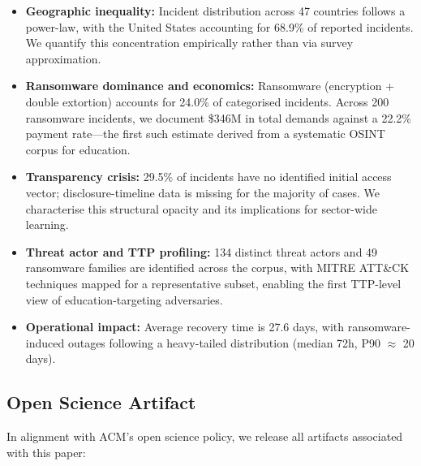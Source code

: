 \documentclass[sigconf,anonymous]{acmart}
\newcommand{\numcountries}{47\xspace}
\newcommand{\numransomware}{200\xspace}
\newcommand{\numactors}{134\xspace}
\newcommand{\numfamilies}{49\xspace}
\newcommand{\avgrecovery}{27.6\xspace}
\newcommand{\totaldemanded}{\$346M\xspace}
\newcommand{\paymentrate}{22.2\%\xspace}
\begin{document}
\begin{itemize}[leftmargin=*,nosep]
  \item \textbf{Geographic inequality:} Incident distribution across \numcountries countries follows a power-law, with the United States accounting for 68.9\% of reported incidents. We quantify this concentration empirically rather than via survey approximation.

  \item \textbf{Ransomware dominance and economics:} Ransomware (encryption + double extortion) accounts for 24.0\% of categorised incidents. Across \numransomware ransomware incidents, we document \totaldemanded in total demands against a \paymentrate payment rate---the first such estimate derived from a systematic OSINT corpus for education.

  \item \textbf{Transparency crisis:} 29.5\% of incidents have no identified initial access vector; disclosure-timeline data is missing for the majority of cases. We characterise this structural opacity and its implications for sector-wide learning.

  \item \textbf{Threat actor and TTP profiling:} \numactors distinct threat actors and \numfamilies ransomware families are identified across the corpus, with MITRE ATT\&CK techniques mapped for a representative subset, enabling the first TTP-level view of education-targeting adversaries.

  \item \textbf{Operational impact:} Average recovery time is \avgrecovery days, with ransomware-induced outages following a heavy-tailed distribution (median 72h, P90 $\approx$ 20 days).
\end{itemize}

\subsection{Open Science Artifact}\label{sec:contrib:openscience}

In alignment with ACM's open science policy, we release all artifacts associated with this paper:
\end{document}
